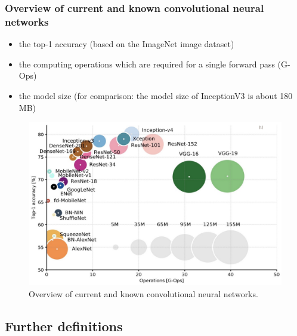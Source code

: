 \documentclass[10pt]{article}
\newif\ifen
\newif\ifde
\newcommand{\en}[1]{\ifen#1\fi}
\newcommand{\de}[1]{\ifde#1\fi}
\begin{document}
			\subsubsection{Overview of current and known convolutional neural networks}
				\de{Zu guter Letzt folgen hier noch ein paar aktuelle und bekannte Convolutional Neuronal networks. Sie unterscheiden sich hauptsächlich in folgenden Metriken, wobei in Kombination jedes Netzwerk seine Vor- und Nachteile besitzt:}
				\en{Last but not least, here are a few current and well-known convolutional neural networks. They differ mainly in the following metrics, whereby in combination each network has its advantages and disadvantages:}

				\begin{itemize}
					\item the top-1 accuracy (based on the ImageNet image dataset)
					\item the computing operations which are required for a single forward pass (G-Ops)
					\item the model size (for comparison: the model size of InceptionV3 is about 180 MB)
				\end{itemize}
		
				\begin{figure}[H]
					\centering
					\includegraphics[width=1.0\textwidth]{images/tl_models}
					\caption[Overview of current and known convolutional neural networks.]{Overview of current and known convolutional neural networks.\footnotemark}
					\label{fig:beispiel5}
				\end{figure}

		\subsection{Further definitions}
		\label{sec:section_further_definitions}
\end{document}
